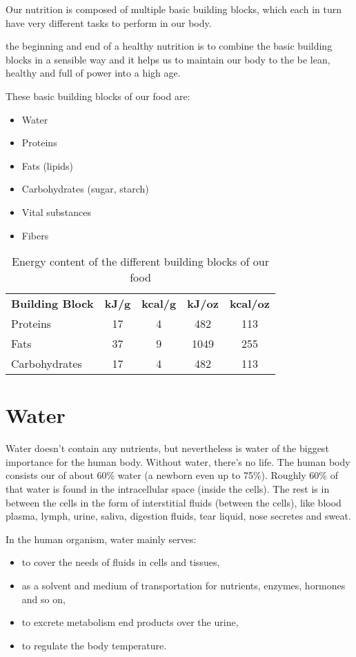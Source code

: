 \documentclass[../main.tex]{subfiles}
\begin{document}
Our nutrition is composed of multiple basic building blocks, which each in turn have very different
tasks to perform in our body.

the beginning and end of a healthy nutrition is to combine the basic building blocks in a sensible way and it helps us
to maintain our body to the be lean, healthy and full of power into a high age.

These basic building blocks of our food are:
\begin{itemize}
\item Water
\item Proteins
\item Fats (lipids)
\item Carbohydrates (sugar, starch)
\item Vital substances
\item Fibers
\end{itemize}

\begin{table}[htb!]
  \centering
  \begin{tabular}{lcccc}
    \textbf{Building Block} & \textbf{kJ/g} & \textbf{kcal/g} & \textbf{kJ/oz} & \textbf{kcal/oz} \\
    Proteins & 17 & 4 & 482 & 113 \\
    Fats & 37 & 9 & 1049 & 255 \\
    Carbohydrates & 17 & 4 & 482 & 113 \\
  \end{tabular}
  \caption{Energy content of the different building blocks of our food}
\end{table}

\section{Water}

Water doesn't contain any nutrients, but nevertheless is water of the biggest importance for the human body.
Without water, there's no life.
The human body consists our of about 60\% water (a newborn even up to 75\%).
Roughly 60\% of that water is found in the intracellular space (inside the cells).
The rest is in between the cells in the form of interstitial fluids (between the cells),
like blood plasma, lymph, urine, saliva, digestion fluids, tear liquid, nose secretes and sweat.


In the human organism, water mainly serves:
\begin{itemize}
\item to cover the needs of fluids in cells and tissues,
\item as a solvent and medium of transportation for nutrients, enzymes, hormones and so on,
\item to excrete metabolism end products over the urine,
\item to regulate the body temperature.
\end{itemize}
\end{document}
